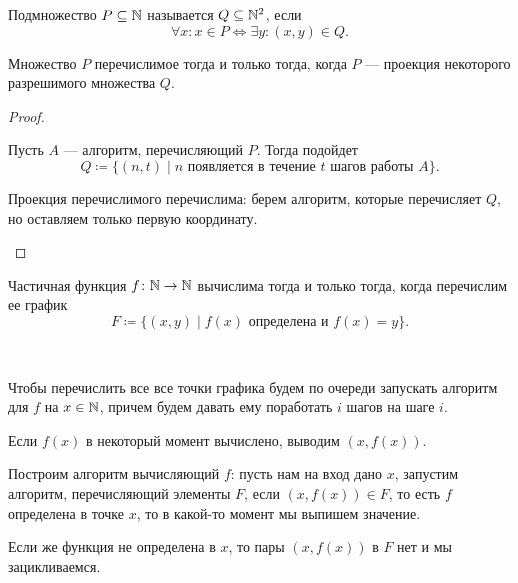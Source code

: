 \begin{defn}[Проекция]
	Подмножество $ P \subseteq \mathbb{N}$ называется  $ Q \subseteq \mathbb{N}^2$, если   \[
		\forall x \colon x \in  P \Longleftrightarrow \exists y \colon  (x, y) \in  Q
	.\] 
\end{defn}

\begin{thm}[О проекции]
    Множество $ P$ перечислимое тогда и только тогда, когда $ P$ --- проекция некоторого разрешимого множества $ Q$.
\end{thm}
\begin{proof}
    ~\begin{description}
        \item {} 
			Пусть $ A$ --- алгоритм, перечисляющий $ P$. Тогда подойдет
			\[
				Q \coloneqq \{(n, t) \mid n \text{ появляется в течение } t \text{ шагов работы } A\}
			.\] 
        \item {} 
			Проекция перечислимого перечислима: берем алгоритм, которые перечисляет $ Q$, но оставляем только первую координату.
    \end{description} 
\end{proof}

\begin{thm}[О графике]
    Частичная функция $ f\colon \mathbb{N} \to \mathbb{N}$ вычислима тогда и только тогда, когда перечислим ее график 
	\[
		F \coloneqq  \{(x, y) \mid f(x) \text{ определена и } f(x) = y\}
	.\] 
\end{thm}
\begin{proof*}
    ~ \begin{description}
        \item {} 
	    Чтобы перечислить все все точки графика будем по очереди запускать алгоритм для $ f$ на $ x \in \mathbb{N}$, причем будем давать ему поработать $ i$ шагов на шаге $ i$.
	    
	    Если $ f(x)$ в некоторый момент вычислено, выводим $ (x, f(x))$.
        \item {} 
	    Построим алгоритм вычисляющий $ f$: пусть нам на вход дано $ x$, запустим алгоритм, перечисляющий элементы $ F$, если $ (x, f(x)) \in F$, то есть $ f$ определена в точке $ x$, то в какой-то момент мы выпишем значение.  

	    Если же функция не определена в $ x$, то пары $ (x, f(x))$ в $ F$ нет и мы зацикливаемся.
    \end{description} 
\end{proof*}



